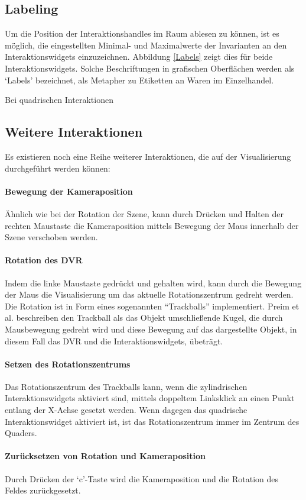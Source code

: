 \documentclass[a4paper,fontsize=12pt,toc=bib,halfparskip]{scrartcl}
\begin{document}
\subsection{Labeling}
Um die Position der Interaktionshandles im Raum ablesen zu k\"onnen, ist es m\"oglich, die eingestellten Minimal- und Maximalwerte der Invarianten an den Interaktionswidgets einzuzeichnen. Abbildung \ref{Labels} zeigt dies f\"ur beide Interaktionswidgets. Solche Beschriftungen in grafischen Oberfl\"achen werden als `Labels' bezeichnet, als Metapher zu Etiketten an Waren im Einzelhandel.

Bei quadrischen Interaktionen 

\subsection{Weitere Interaktionen}
Es existieren noch eine Reihe weiterer Interaktionen, die auf der Visualisierung durchgef\"uhrt werden k\"onnen:
\paragraph{Bewegung der Kameraposition}
\"Ahnlich wie bei der Rotation der Szene, kann durch Dr\"ucken und Halten der rechten Maustaste die Kameraposition mittels Bewegung der Maus innerhalb der Szene verschoben werden.
\paragraph{Rotation des DVR}
Indem die linke Maustaste gedr\"uckt und gehalten wird, kann durch die Bewegung der Maus die Visualisierung um das aktuelle Rotationszentrum gedreht werden. Die Rotation ist in Form eines sogenannten ``Trackballs'' implementiert. Preim et al. beschreiben den Trackball als das Objekt umschlie{\ss}ende Kugel, die durch Mausbewegung gedreht wird und diese Bewegung auf das dargestellte Objekt, in diesem Fall das DVR und die Interaktionswidgets, \"ubetr\"agt.
\paragraph{Setzen des Rotationszentrums}
Das Rotationszentrum des Trackballs kann, wenn die zylindrischen Interaktionswidgets aktiviert sind, mittels doppeltem Linksklick an einen Punkt entlang der X-Achse gesetzt werden. Wenn dagegen das quadrische Interaktionswidget aktiviert ist, ist das Rotationszentrum immer im Zentrum des Quaders.
\paragraph{Zur\"ucksetzen von Rotation und Kameraposition}
Durch Dr\"ucken der `c'-Taste wird die Kameraposition und die Rotation des Feldes zur\"uckgesetzt.
\end{document}

